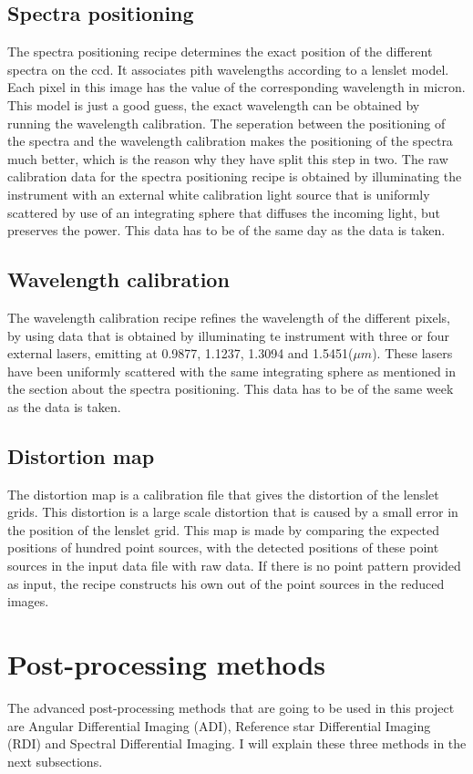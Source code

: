 \documentclass[twoside,single]{lion-msc}
\begin{document}
\subsection{Spectra positioning}
The spectra positioning recipe determines the exact position of the different spectra on the ccd. It associates pith wavelengths according to a lenslet model. Each pixel in this image has the value of the corresponding wavelength in micron. This model is just a good guess, the exact wavelength can be obtained by running the wavelength calibration. The seperation between the positioning of the spectra and the wavelength calibration makes the positioning of the spectra much better, which is the reason why they have split this step in two. The raw calibration data for the spectra positioning recipe is obtained by illuminating the instrument with an external white calibration light source that is uniformly scattered by use of an integrating sphere that diffuses the incoming light, but preserves the power. This data has to be of the same day as the data is taken.

\subsection{Wavelength calibration}
The wavelength calibration recipe refines the wavelength of the different pixels, by using data that is obtained by illuminating te instrument with three or four external lasers, emitting at 0.9877, 1.1237, 1.3094 and 1.5451($\mu m$). These lasers have been uniformly scattered with the same integrating sphere as mentioned in the section about the spectra positioning. This data has to be of the same week as the data is taken.\cite{Observatory2007}

\subsection{Distortion map}
The distortion map is a calibration file that gives the distortion of the lenslet grids. This distortion is a large scale distortion that is caused by a small error in the position of the lenslet grid. This map is made by comparing the expected positions of hundred point sources, with the detected positions of these point sources in the input data file with raw data. If there is no point pattern provided as input, the recipe constructs his own out of the point sources in the reduced images.

\section{Post-processing methods}
The advanced post-processing methods that are going to be used in this project are Angular Differential Imaging (ADI), Reference star Differential Imaging (RDI) and Spectral Differential Imaging. I will explain these three methods in the next subsections.
\end{document}
